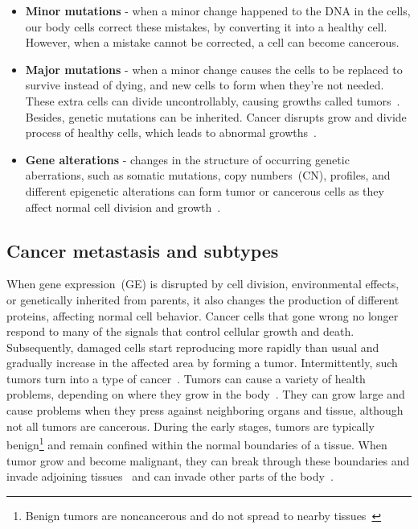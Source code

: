 \begin{itemize}[noitemsep]
    \item \textbf{Minor mutations} - when a minor change happened to the DNA in the cells, our body cells correct these mistakes, by converting it into a healthy cell. However, when a mistake cannot be corrected, a cell can become cancerous. 
    \item \textbf{Major mutations} - when a minor change causes the cells to be replaced to survive instead of dying, and new cells to form when they're not needed. These extra cells can divide uncontrollably, causing growths called tumors~\cite{82Tomczak}. Besides, genetic mutations can be inherited. Cancer disrupts grow and divide process of healthy cells, which leads to abnormal growths~\cite{pancan}. 
    \item \textbf{Gene alterations} - changes in the structure of occurring genetic aberrations, such as somatic mutations, copy numbers~(CN), profiles, and different epigenetic alterations can form tumor or cancerous cells as they affect normal cell division and  growth~\cite{82Tomczak,13cancerdef,19Cruz}. 
\end{itemize}

\subsection{Cancer metastasis and subtypes}
When gene expression~(GE) is disrupted by cell division, environmental effects, or genetically inherited from parents, it also changes the production of different proteins, affecting normal cell behavior. Cancer cells that gone wrong no longer respond to many of the signals that control cellular growth and death. Subsequently, damaged cells start reproducing more rapidly than usual and gradually increase in the affected area by forming a tumor. Intermittently, such tumors turn into a type of cancer~\cite{zuo2019identification,24Podolsky}. Tumors can cause a variety of health problems, depending on where they grow in the body~\cite{zuo2019identification}. They can grow large and cause problems when they press against neighboring organs and tissue, although not all tumors are cancerous. During the early stages, tumors are typically benign\footnote{Benign tumors are noncancerous and do not spread to nearby tissues~\cite{o2010unit}} and remain confined within the normal boundaries of a tissue. When tumor grow and become malignant, they can break through these boundaries and invade adjoining tissues~\cite{o2010unit} and can invade other parts of the body~\cite{13cancerdef}. 

